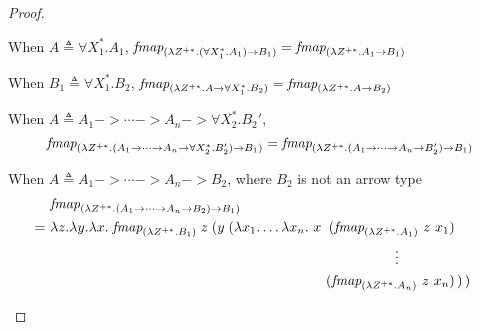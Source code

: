 \begin{proof}
\begin{itemize}
        When $A \triangleq \forall X_1^{*}.A_1$,
        $\textit{fmap}_{(\lambda Z^{+*}.(\forall X_1^{*}.A_1) -> B_1)}
        = \textit{fmap}_{(\lambda Z^{+*}.A_1 -> B_1)}$
        
        When $B_1 \triangleq \forall X_1^{*}.B_2$,
        $\textit{fmap}_{(\lambda Z^{+*}.A -> \forall X_1^{*}.B_2)}
        = \textit{fmap}_{(\lambda Z^{+*}.A -> B_2)}$        

        \begin{singlespace}
        When $A \triangleq A_1 -> \cdots -> A_n -> \forall X_2^{*}.B_2'$,
        \vspace{-1.5ex}
        \[\textit{fmap}_{(\lambda Z^{+*}.(A_1 -> \cdots -> A_n -> \forall X_2^{*}.B_2') -> B_1)}
        = \textit{fmap}_{(\lambda Z^{+*}.(A_1 -> \cdots -> A_n -> B_2') -> B_1)} \]

        When $A \triangleq A_1 -> \cdots -> A_n -> B_2$,
        where $B_2$ is not an arrow type
        \vspace{-1.5ex}
        \begin{align*}
          & \textit{fmap}_{(\l Z^{+*}.(A_1 -> \cdots -> A_n -> B_2) -> B_1)} \\
        =~& \l z.\l y. \l x.\;
        \textit{fmap}_{(\l Z^{+*}.B_1)} \; z \;
                (y \; (\l x_1.\ldots\l x_n. ~
                   x  &\!\!\!\!(\textit{fmap}_{(\l Z^{+*}.A_1)} ~ z ~ x_1)& \\
                     &&\!\!\!\!\vdots \qquad\qquad& \\
                     &&\!\!\!\!(\textit{fmap}_{(\l Z^{+*}.A_n)} ~ z ~ x_n)&
                \,) \,)
        \end{align*}
        \end{singlespace}\vspace*{-4ex}
\end{itemize}
\end{proof}

